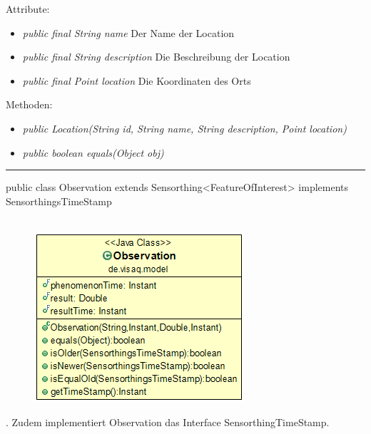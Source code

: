 Attribute:
\begin{itemize} 
	\item \emph{public final String name} Der Name der Location
	\item \emph{public final String description} Die Beschreibung der Location
	\item \emph{public final Point location} Die Koordinaten des Orts
\end{itemize}
Methoden:
\begin{itemize} 
	\item \emph{public Location(String id, String name, String description, Point location)} 
	\item \emph{public boolean equals(Object obj)} 
\end{itemize}

\rule{\textwidth}{0.4pt}
public class Observation extends Sensorthing<FeatureOfInterest> implements SensorthingsTimeStamp
\\\\
\begin{minipage}{0.3\textwidth}
	\begin{figure}[H]
		\includegraphics[scale = 0.5
		]{media/frontend/model/ObservationClass.png}
	\end{figure}
\end{minipage} \hfill
\begin{minipage}{0.6\textwidth}
	. Zudem implementiert Observation das Interface SensorthingTimeStamp.
\end{minipage}


